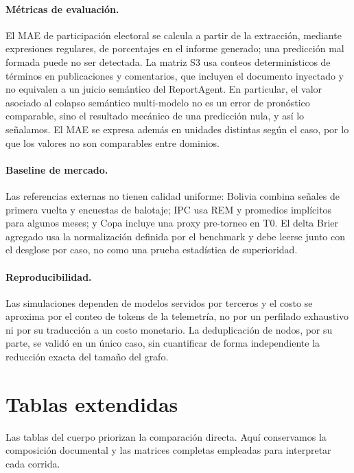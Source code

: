 \documentclass[11pt]{article}
\begin{document}
\paragraph{Métricas de evaluación.} El MAE de participación electoral se calcula a partir de la extracción, mediante expresiones regulares, de porcentajes en el informe generado; una predicción mal formada puede no ser detectada. La matriz S3 usa conteos determinísticos de términos en publicaciones y comentarios, que incluyen el documento inyectado y no equivalen a un juicio semántico del ReportAgent. En particular, el valor asociado al colapso semántico multi-modelo no es un error de pronóstico comparable, sino el resultado mecánico de una predicción nula, y así lo señalamos. El MAE se expresa además en unidades distintas según el caso, por lo que los valores no son comparables entre dominios.

\paragraph{Baseline de mercado.} Las referencias externas no tienen calidad uniforme: Bolivia combina señales de primera vuelta y encuestas de balotaje; IPC usa REM y promedios implícitos para algunos meses; y Copa incluye una proxy pre-torneo en T0. El delta Brier agregado usa la normalización definida por el benchmark y debe leerse junto con el desglose por caso, no como una prueba estadística de superioridad.

\paragraph{Reproducibilidad.} Las simulaciones dependen de modelos servidos por terceros y el costo se aproxima por el conteo de tokens de la telemetría, no por un perfilado exhaustivo ni por su traducción a un costo monetario. La deduplicación de nodos, por su parte, se validó en un único caso, sin cuantificar de forma independiente la reducción exacta del tamaño del grafo.



\clearpage
\onecolumn
\appendix
\section{Tablas extendidas}
\label{app:extended_tables}

Las tablas del cuerpo priorizan la comparación directa. Aquí conservamos la composición documental y las matrices completas empleadas para interpretar cada corrida.
\end{document}
